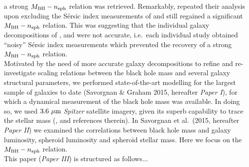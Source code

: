 \documentclass[preprint2]{emulateapj}
\begin{document}
a strong $M_{\rm BH} - n_{\rm sph}$ relation was retrieved. 
Remarkably, \cite{savorgnan2013} repeated their analysis upon excluding the S\'ersic index measurements of \cite{grahamdriver2007} 
and still regained a significant $M_{\rm BH} - n_{\rm sph}$ relation. 
This was suggesting that the individual galaxy decompositions of \cite{sani2011}, \cite{vika2012} and \cite{beifiori2012} were not accurate, 
i.e.~each individual study obtained ``noisy'' S\'ersic index measurements 
which prevented the recovery of a strong $M_{\rm BH} - n_{\rm sph}$ relation. \\
Motivated by the need of more accurate galaxy decompositions to refine and re-investigate scaling relations 
between the black hole mass and several galaxy structural parameters, 
we performed state-of-the-art modelling for the largest sample of galaxies to date (Savorgnan \& Graham 2015, hereafter \emph{Paper I}),  
for which a dynamical measurement of the black hole mass was available.
In doing so, we used $3.6\rm~\mu m$ \emph{Spitzer} satellite imagery, 
given its superb capability to trace the stellar mass (\citealt{sheth2010}, and references therein). 
In Savorgnan et al.~(2015, hereafter \emph{Paper II}) we examined the correlations between black hole mass and 
galaxy luminosity, spheroid luminosity and spheroid stellar mass. 
Here we focus on the $M_{\rm BH} - n_{\rm sph}$ relation. \\
This paper (\emph{Paper III}) is structured as follows...
\end{document}

